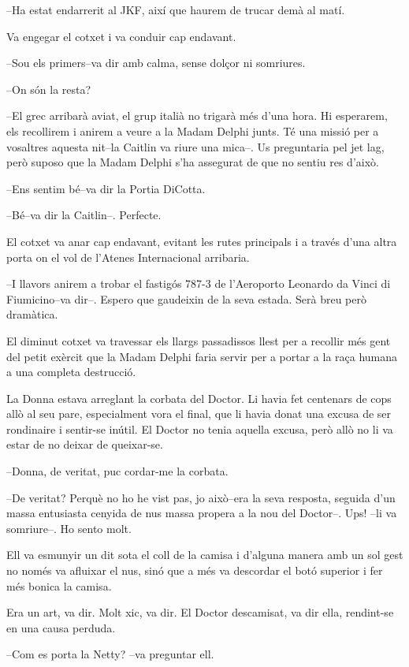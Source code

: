 --Ha estat endarrerit al JKF, així que haurem de trucar demà al matí.

Va engegar el cotxet i va conduir cap endavant.

--Sou els primers--va dir amb calma, sense dolçor ni somriures.

--On són la resta?

--El grec arribarà aviat, el grup italià no trigarà més d'una hora. Hi
esperarem, els recollirem i anirem a veure a la Madam Delphi junts. Té
una missió per a vosaltres aquesta nit--la Caitlin va riure una mica--.
Us preguntaria pel jet lag, però suposo que la Madam Delphi s'ha
assegurat de que no sentiu res d'això.

--Ens sentim bé--va dir la Portia DiCotta.

--Bé--va dir la Caitlin--. Perfecte.

El cotxet va anar cap endavant, evitant les rutes principals i a través
d'una altra porta on el vol de l'Atenes Internacional arribaria.

--I llavors anirem a trobar el fastigós 787-3 de l'Aeroporto Leonardo da
Vinci di Fiumicino--va dir--. Espero que gaudeixin de la seva estada.
Serà breu però dramàtica.

El diminut cotxet va travessar els llargs passadissos llest per a
recollir més gent del petit exèrcit que la Madam Delphi faria servir per
a portar a la raça humana a una completa destrucció.

La Donna estava arreglant la corbata del Doctor. Li havia fet centenars
de cops allò al seu pare, especialment vora el final, que li havia donat
una excusa de ser rondinaire i sentir-se inútil. El Doctor no tenia
aquella excusa, però allò no li va estar de no deixar de queixar-se.

--Donna, de veritat, puc cordar-me la corbata.

--De veritat? Perquè no ho he vist pas, jo això--era la seva resposta,
seguida d'un massa entusiasta cenyida de nus massa propera a la nou del
Doctor--. Ups! --li va somriure--. Ho sento molt.

Ell va esmunyir un dit sota el coll de la camisa i d'alguna manera amb
un sol gest no només va afluixar el nus, sinó que a més va descordar el
botó superior i fer més bonica la camisa.

Era un art, va dir. Molt xic, va dir. El Doctor descamisat, va dir ella,
rendint-se en una causa perduda.

--Com es porta la Netty? --va preguntar ell.

